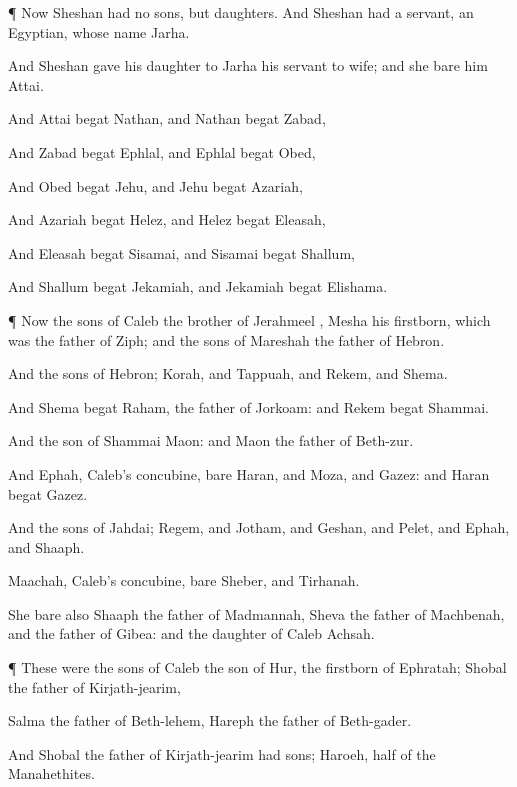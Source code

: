 {\par }{\PP {}¶ Now
Sheshan had no
sons, but
daughters. And
Sheshan had a
servant, an
Egyptian, whose
name
{}
Jarha.

And
Sheshan
gave his
daughter to
Jarha his
servant to
wife; and she
bare him
Attai.

And
Attai
begat
Nathan, and
Nathan
begat
Zabad,

And
Zabad
begat
Ephlal, and
Ephlal
begat
Obed,

And
Obed
begat
Jehu, and
Jehu
begat
Azariah,

And
Azariah
begat
Helez, and
Helez
begat
Eleasah,

And
Eleasah
begat
Sisamai, and
Sisamai
begat
Shallum,

And
Shallum
begat
Jekamiah, and
Jekamiah
begat
Elishama.


\par }{\PP {}¶ Now the
sons of
Caleb the
brother of
Jerahmeel
{},
Mesha his
firstborn, which was the
father of
Ziph; and the
sons of
Mareshah the
father of
Hebron.

And the
sons of
Hebron;
Korah, and
Tappuah, and
Rekem, and
Shema.

And
Shema
begat
Raham, the
father of
Jorkoam: and
Rekem
begat
Shammai.

And the
son of
Shammai
{}
Maon: and
Maon
{} the
father of
Beth-zur.

And
Ephah,
Caleb’s
concubine,
bare
Haran, and
Moza, and
Gazez: and
Haran
begat
Gazez.

And the
sons of
Jahdai;
Regem, and
Jotham, and
Geshan, and
Pelet, and
Ephah, and
Shaaph.

Maachah,
Caleb’s
concubine,
bare
Sheber, and
Tirhanah.

She
bare also
Shaaph the
father of
Madmannah,
Sheva the
father of
Machbenah, and the
father of
Gibea: and the
daughter of
Caleb
{}
Achsah.


\par }{\PP {}¶ These were the
sons of
Caleb the
son of
Hur, the
firstborn of
Ephratah;
Shobal the
father of
Kirjath-jearim,

Salma the
father of
Beth-lehem,
Hareph the
father of
Beth-gader.

And
Shobal the
father of
Kirjath-jearim had
sons;
Haroeh,
{}
half of the
Manahethites.

}

